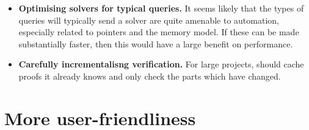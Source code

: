 \begin{itemize}
    \item \textbf{Optimising solvers for typical queries.} It seems
        likely that the types of queries  will typically send a
        solver are quite amenable to automation, especially related
        to pointers and the  memory model. If these can be
        made substantially faster, then this would have a large
        benefit on  performance.
    \item \textbf{Carefully incrementalisng verification.} For large projects,
         should cache proofs it already knows and only check the parts
        which have changed.
\end{itemize}

\section{More user-friendliness}

